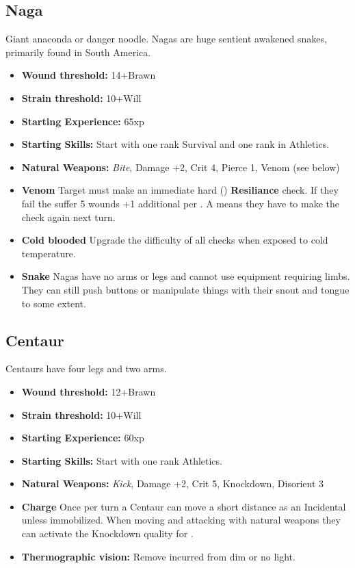 \documentclass{book}
\begin{document}
\begin{multicols}{2}
	\subsection{Naga}
	Giant anaconda or danger noodle. Nagas are huge sentient awakened snakes, primarily found in South America.
	
	\begin{itemize}
		\item \textbf{Wound threshold:} 14+Brawn
		\item \textbf{Strain threshold:} 10+Will
		\item \textbf{Starting Experience:} 65xp
		\item \textbf{Starting Skills:} Start with one rank Survival and one rank in Athletics.
		\item \textbf{Natural Weapons:} \textit{Bite}, Damage +2, Crit 4, Pierce 1, Venom (see below)
		\item \textbf{Venom} Target must make an immediate hard (\DifficultyDie \DifficultyDie \DifficultyDie) \textbf{Resiliance} check. If they fail the suffer 5 wounds +1 additional per \Threat. A \Despair means they have to make the check again next turn.
		\item \textbf{Cold blooded} Upgrade the difficulty of all checks when exposed to cold temperature.
		\item \textbf{Snake} Nagas have no arms or legs and cannot use equipment requiring limbs. They can still push buttons or manipulate things with their snout and tongue to some extent.
	\end{itemize}
	
	
	\subsection{Centaur}
	Centaurs have four legs and two arms.
	
	\begin{itemize}
		\item \textbf{Wound threshold:} 12+Brawn
		\item \textbf{Strain threshold:} 10+Will
		\item \textbf{Starting Experience:} 60xp
		\item \textbf{Starting Skills:} Start with one rank Athletics.
		\item \textbf{Natural Weapons:} \textit{Kick}, Damage +2, Crit 5, Knockdown, Disorient 3
		\item \textbf{Charge} Once per turn a Centaur can move a short distance as an Incidental unless immobilized. When moving and attacking with natural weapons they can activate the Knockdown quality for \Advantage.
		\item \textbf{Thermographic vision:} Remove \SetbackDie \SetbackDie incurred from dim or no light.
	\end{itemize}
\end{multicols}
\end{document}
